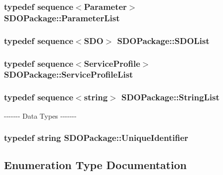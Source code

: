 \subsubsection[{ParameterList}]{\setlength{\rightskip}{0pt plus 5cm}typedef sequence$<${\bf Parameter}$>$ {\bf SDOPackage::ParameterList}}\label{namespaceSDOPackage_ac7ed6ef96e20edd9db20df029d1d46d2}
\subsubsection[{SDOList}]{\setlength{\rightskip}{0pt plus 5cm}typedef sequence$<${\bf SDO}$>$ {\bf SDOPackage::SDOList}}\label{namespaceSDOPackage_ab3569f8f3e2127ff298ae3c526cf3921}
\subsubsection[{ServiceProfileList}]{\setlength{\rightskip}{0pt plus 5cm}typedef sequence$<${\bf ServiceProfile}$>$ {\bf SDOPackage::ServiceProfileList}}\label{namespaceSDOPackage_ab56433e04a6155a19aeae801c45155e8}
\subsubsection[{StringList}]{\setlength{\rightskip}{0pt plus 5cm}typedef sequence$<$string$>$ {\bf SDOPackage::StringList}}\label{namespaceSDOPackage_a808e705041501570a7ef8870afe0d1a8}
-\/-\/-\/-\/-\/-\/-\/ Data Types -\/-\/-\/-\/-\/-\/-\/ 
\subsubsection[{UniqueIdentifier}]{\setlength{\rightskip}{0pt plus 5cm}typedef string {\bf SDOPackage::UniqueIdentifier}}\label{namespaceSDOPackage_a05a058395bb070fc59e9d81d4b1f9f98}


\subsection{Enumeration Type Documentation}
